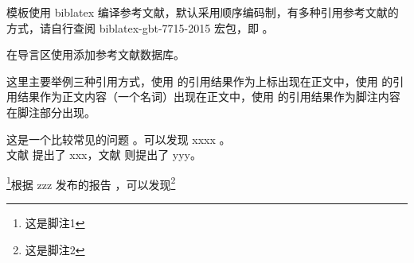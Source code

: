 模板使用 biblatex 编译参考文献，默认采用顺序编码制，有多种引用参考文献的方式，请自行查阅 biblatex-gbt-7715-2015 宏包，即 。

在导言区使用\clist{}添加参考文献数据库。

这里主要举例三种引用方式，使用  的引用结果作为上标出现在正文中，使用  的引用结果作为正文内容（一个名词）出现在正文中，使用  的引用结果作为脚注内容在脚注部分出现。



\begin{texcode}[]{}
  这是一个比较常见的问题 \cite{barella_situ_2021}。可以发现 xxxx \cite{atta_enhanced_2021}。\\

  文献\parencite{张燕2013电气自动化在电气工程中的应用探讨} 提出了 xxx，文献 \parencite{黄雪芳2012探讨电气工程中自动化技术的应用} 则提出了 yyy。

\end{texcode}

\footnote{这是脚注1}根据 zzz 发布的报告 ，可以发现\footnote{这是脚注2}
